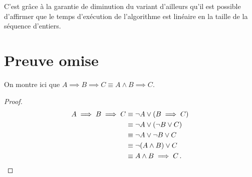 \documentclass{elsarticle}
\begin{document}
C'est grâce à la garantie de diminution du variant d'ailleurs qu'il est possible d'affirmer que le temps d'exécution de l'algorithme est linéaire en la taille de la séquence d'entiers.

\appendix
\section{Preuve omise}
\label{ann:om}
On montre ici que $A \implies B \implies C \equiv A \land B \implies C$.
\begin{proof}
\begin{align*}
A \implies B \implies C &\equiv \lnot A \lor (B \implies C) \\
&\equiv \lnot A \lor (\lnot B \lor C) \\
&\equiv \lnot A \lor \lnot B \lor C \\
&\equiv \lnot(A \land B) \lor C \\
&\equiv A \land B \implies C\,.\qedhere
\end{align*}
\end{proof}
\end{document}
